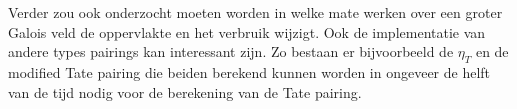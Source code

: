 Verder zou ook onderzocht moeten worden in welke mate werken over een groter Galois veld de oppervlakte en het verbruik wijzigt. Ook de implementatie van andere types pairings kan interessant zijn. Zo bestaan er bijvoorbeeld de $\eta_T$ en de modified Tate pairing die beiden berekend kunnen worden in ongeveer de helft van de tijd nodig voor de berekening van de Tate pairing.

